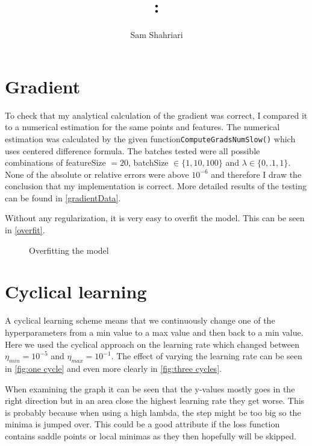 \documentclass[12pt, a4paper]{article}
\author{Sam Shahriari}
\title{\course: \assignment}
\begin{document}
\setlength{\headheight}{15pt}
\maketitle
\section{Gradient}
To check that my analytical calculation of the gradient was correct, I compared it to a numerical estimation for the same points and features. The numerical estimation was calculated by the given function\texttt{ComputeGrads\-NumSlow()} which uses centered difference formula. The batches tested were all possible combinations of featureSize $= 20$, batchSize $\in\{1, 10, 100\}$ and $\lambda \in \{0,.1,1\}$. None of the absolute or relative errors were above $10^{-6}$ and therefore I draw the conclusion that my implementation is correct.
More detailed results of the testing can be found in \autoref{gradientData}.

Without any regularization, it is very easy to overfit the model. This can be seen in \autoref{overfit}.

\begin{figure}[H]
    \scalebox{0.9}{}
    \caption{Overfitting the model}
    \label{overfit}
\end{figure}

\section{Cyclical learning}
A cyclical learning scheme means that we continuously change one of the hyperparameters from a min value to a max value and then back to a min value. Here we used the cyclical approach on the learning rate which changed between $\eta_{min} = 10^{-5}$ and $\eta_{max} = 10^{-1}$. The effect of varying the learning rate can be seen in \autoref{fig:one cycle} and even more clearly in \autoref{fig:three cycles}.

When examining the graph it can be seen that the y-values mostly goes in the right direction but in an area close the highest learning rate they get worse. This is probably because when using a high lambda, the step might be too big so the minima is jumped over. This could be a good attribute if the loss function contains saddle points or local minimas as they then hopefully  will be skipped.
\end{document}
